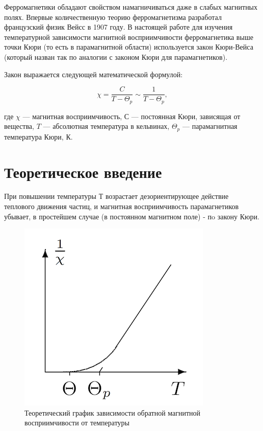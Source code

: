 \documentclass[12pt]{kiarticle}
\begin{document}
Ферромагнетики обладают свойством намагничиваться даже в слабых магнитных полях. Впервые количественную теорию ферромагнетизма разработал французский физик Вейсс в 1907 году. В настоящей работе для изучения температурной зависимости магнитной восприимчивости ферромагнетика выше точки Кюри (то есть в парамагнитной области) используется закон Кюри-Вейса (который назван так по аналогии с законом Кюри для парамагнетиков).

Закон выражается следующей математической формулой:

 \begin{equation}\label{QW}
 \chi ={\frac  {C}{T-\Theta_p}} \sim \frac{1}{T - \Theta_p}, 
 \end{equation}
 
где $ \chi  $ — магнитная восприимчивость, $ С $ — постоянная Кюри, зависящая от вещества, $ T $ — абсолютная температура в кельвинах, $ \Theta_p  $ — парамагнитная температура Кюри, К.

\section{Теоретическое введение}

При повышении температуры $ Т $ возрастает дезориентирующее действие теплового движения частиц, и магнитная восприимчивость парамагнетиков
убывает, в простейшем случае (в постоянном магнитном
поле) - пo закону Кюри.

\begin{figure} 
	\includegraphics{342_gr}
	\caption{Теоретический график зависимости обратной магнитной восприимчивости от температуры}
\end{figure}
\end{document}
